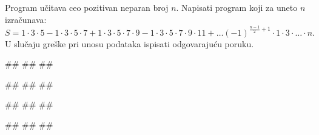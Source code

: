 \begin{Exercise}[difficulty=1, label=1.3_48] 
Program učitava ceo pozitivan neparan broj $n$.  Napisati program koji
za uneto $n$ izračunava:
$$S = 1\cdot3\cdot5 - 1\cdot3\cdot5\cdot7 + 1\cdot3\cdot5\cdot7\cdot9
- 1\cdot3\cdot5\cdot7\cdot9\cdot11 + \ldots
(-1)^{\frac{n-1}{2}+1}\cdot1\cdot3\cdot \ldots \cdot n.$$ U slučaju
greške pri unosu podataka ispisati odgovarajuću poruku. 
  
\begin{miditest}
\begin{upotreba}{1}
#\naslovInt#
##
##
\end{upotreba}
\end{miditest}
\begin{miditest}
\begin{upotreba}{2}
#\naslovInt#
##
##
\end{upotreba}
\end{miditest}

\begin{miditest}
\begin{upotreba}{3}
#\naslovInt#
##
##
\end{upotreba}
\end{miditest}
\begin{miditest}
\begin{upotreba}{4}
#\naslovInt#
##
##
\end{upotreba}
\end{miditest}
\end{Exercise}
\begin{Answer}[ref=1.3_48]
\end{Answer}

